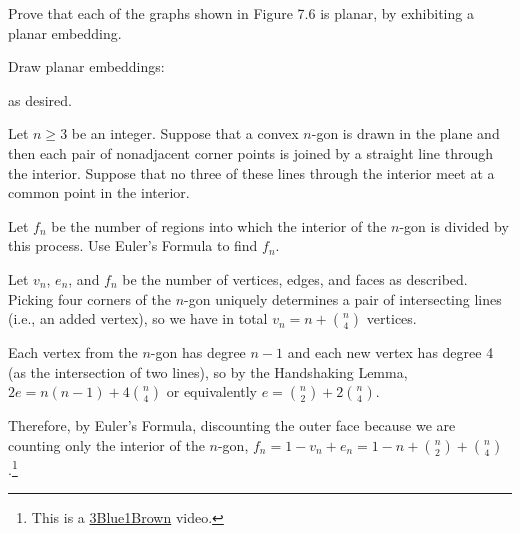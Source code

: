 \documentclass[class=math239,notes,tikz]{agony}
\begin{document}
\begin{xca}
  Prove that each of the graphs shown in Figure 7.6 is planar,
  by exhibiting a planar embedding.
\end{xca}
\begin{sol}
  Draw planar embeddings:
  \begin{center}
    \qquad
  \end{center}
  as desired.
\end{sol}

\begin{xca}
  Let $n \geq 3$ be an integer.
  Suppose that a convex $n$-gon is drawn in the plane
  and then each pair of nonadjacent corner points
  is joined by a straight line through the interior.
  Suppose that no three of these lines through the interior
  meet at a common point in the interior.

  Let $f_n$ be the number of regions into which
  the interior of the $n$-gon is divided by this process.
  Use Euler's Formula to find $f_n$.
\end{xca}
\begin{sol}
  Let $v_n$, $e_n$, and $f_n$ be the number of vertices, edges, and faces as described.
  Picking four corners of the $n$-gon uniquely determines
  a pair of intersecting lines (i.e., an added vertex),
  so we have in total $v_n = n + \binom{n}{4}$ vertices.

  Each vertex from the $n$-gon has degree $n-1$
  and each new vertex has degree 4 (as the intersection of two lines),
  so by the Handshaking Lemma, $2e = n(n-1) + 4\binom{n}{4}$
  or equivalently $e = \binom{n}{2} + 2\binom{n}{4}$.

  Therefore, by Euler's Formula, discounting the outer face because 
  we are counting only the interior of the $n$-gon, $f_n = 1 - v_n + e_n
    = 1 - n + \binom{n}{2} + \binom{n}{4}$.\footnote{This is a \href{https://www.youtube.com/watch?v=K8P8uFahAgc}{3Blue1Brown} video.}
\end{sol}
\end{document}
